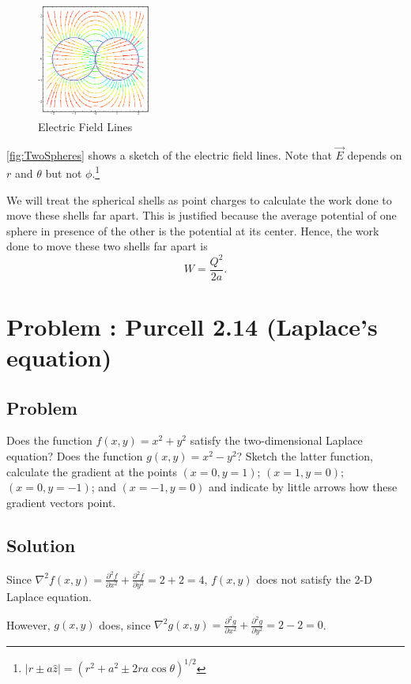 \documentclass[solutions]{esg8022pset}
\begin{document}
  \begin{figure}[ht]
    \centering
    \includegraphics[width=0.33\textwidth]{ps03_sol_07}
    \caption{Electric Field Lines}
    \label{fig:TwoSpheres}
  \end{figure}

  \autoref{fig:TwoSpheres} shows a sketch of the electric field lines. Note that $\vec{E}$ depends on $r$ and $\theta$ but not $\phi$.\footnote{$|r\pm a \hat z| = \left(r^2 + a^2 \pm 2 ra\cos \theta \right)^{1/2}$}

  We will treat the spherical shells as point charges to calculate the work done to move these shells far apart. This is justified because the average potential of one sphere in presence of the other is the potential at its center.  %
  Hence, the work done to move these two shells far apart is
  $$W = \frac{Q^2}{2a}.$$
\section{Problem \thesection: Purcell 2.14 (Laplace's equation)}
\subsection{Problem}
  Does the function $f(x, y) = x^2 + y^2$ satisfy the two-dimensional
  Laplace equation? Does the function $g(x, y) = x^2 - y^2$?
  Sketch the latter function, calculate the gradient at the points $(x = 0, y = 1)$;
  $(x = 1, y = 0)$; $(x = 0, y = -1)$; and $(x = -1, y = 0)$ and indicate
  by little arrows how these gradient vectors point.
\subsection{Solution}
  Since $\nabla^2 f(x,y)=\frac{\partial^2 f}{\partial x^2}+\frac{\partial^2 f}{\partial y^2}=2+2=4$, $f(x,y)$ does not satisfy the 2-D Laplace equation.

  However, $g(x,y)$ does, since $\nabla^2 g(x,y)=\frac{\partial^2 g}{\partial x^2}+\frac{\partial^2 g}{\partial y^2}=2-2=0$.
\end{document}

